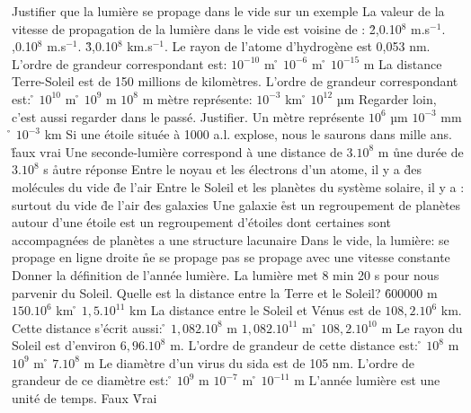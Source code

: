\q
Justifier que la lumière se propage dans le vide sur un exemple
\q
La valeur de la vitesse de propagation de la lumière dans le vide est voisine de :
\r
	2,0.10$^{8}$ m.s$^{-1}$.
,0.10$^{8}$ m.s$^{-1}$.
\r
3,0.10$^{8}$ km.s$^{-1}$.
\q
Le rayon de l'atome d'hydrogène est 0,053 nm. L'ordre de grandeur correspondant est: 
\rv
$10^{-10}$ m
\r
$10^{-6}$ m
\r
$10^{-15}$ m
\q La distance Terre-Soleil est de 150 millions de kilomètres. L'ordre de grandeur correspondant est: 
\r
$10^{10}$ m
\r
$10^{9}$ m
\rv
$10^{8}$ m
 mètre représente: 
\rv
$10^{-3}$ km
\r
$10^{12}$ µm
\q
Regarder loin, c'est aussi regarder dans le passé. Justifier.
\q
Un mètre représente
\rv
$10^{6}$ µm
\rv
$10^{-3}$ mm
\r
$10^{-3}$ km
\q
Si une étoile située à 1000 a.l. explose, nous le saurons dans mille ans.
\r
faux
\rv
vrai
\q
Une seconde-lumière correspond à
\rv
une distance de $3.10^{8}$ m
\r
une durée de $3.10^{8}$ s
\r
autre réponse
\q
Entre le noyau et les électrons d'un atome, il y a 
\r
des molécules 
\rv
du vide
\r
de l'air     
\q     
Entre le Soleil et les planètes du système solaire, il y a :   
\rv
surtout du vide   
\r
de l'air   
\r
des galaxies
\q  
Une galaxie
\r
est un regroupement de planètes autour d'une étoile   
\rv
est un regroupement d'étoiles dont certaines sont accompagnées de planètes
\rv
a une structure lacunaire     
\q      
Dans le vide, la lumière: 
\rv
se propage en ligne droite 
\r
ne se propage pas  
\rv
se propage avec une vitesse constante   
\q
Donner la définition de l'année lumière.
\q       
La lumière met 8 min 20 s pour nous parvenir du Soleil. Quelle est la distance entre la Terre  et le Soleil?         
\r
600000 m
\rv
$150.10^6$ km 
\r
$1,5.10^{11}$ km
\q
La distance entre le Soleil et Vénus est de $108,2.10^6$ km. Cette distance s'écrit aussi:                 
\r
$1,082.10^8$ m
\rv
$1,082.10^{11}$ m
\r
$108,2.10^{10}$ m
\q 
Le rayon du Soleil est d'environ $6,96.10^8$ m. L'ordre de grandeur de cette distance   
est:                   
\r 
$10^8$ m 
\rv
$10^9$ m 
\r
$7.10^8$ m 
\q
Le diamètre d'un virus du sida est de 105 nm. L'ordre de grandeur de ce diamètre   
est:           
\r
$10^{9}$ m
\rv
$10^{-7}$ m
\r
$10^{-11}$ m
\q
L'année lumière est une unité de temps.
\rv
Faux
\r
Vrai